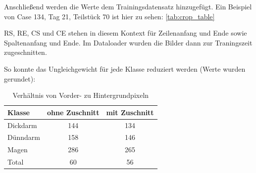 Anschließend werden die Werte dem Trainingsdatensatz hinzugefügt. Ein Beispiel von Case 134, Tag 21, Teilstück 70 ist hier zu sehen: \autoref{tab:crop_table} 

\begin{table}[H]
 \begin{center}
\caption{Ausschnitt aus der Zuschnitt-Tabelle.}\label{tab:crop_table}
 \end{center}
 \end{table}
 
 RS, RE, CS und CE stehen in diesem Kontext für Zeilenanfang und Ende sowie Spaltenanfang und Ende. Im Dataloader wurden die Bilder dann zur Traningszeit zugeschnitten.
 
So konnte das Ungleichgewicht für jede Klasse reduziert werden (Werte wurden gerundet): 

\begin{table}[H]
\centering
\begin{tabular}{|l|c|c|}
\hline
Klasse & ohne Zuschnitt & mit Zuschnitt \\ \hline
Dickdarm & 144 & 134\\ \hline
Dünndarm & 158 & 146 \\ \hline
Magen & 286 & 265\\ \hline
Total & 60 & 56\\ \hline
\end{tabular}
\caption{\label{tab:ratio}Verhältnis von Vorder- zu Hintergrundpixeln}
\end{table}

